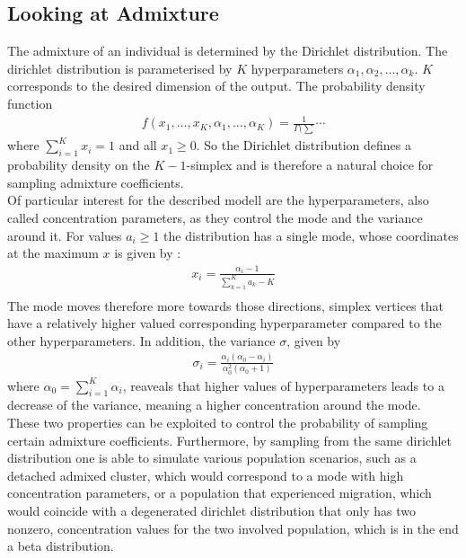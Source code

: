 \documentclass[a4paper, 11pt]{article}
\begin{document}
\subsection{Looking at Admixture}
The admixture of an individual is determined by the Dirichlet distribution. The dirichlet distribution is parameterised by $K$ hyperparameters $\alpha_1,\alpha_2, \ldots, \alpha_k$. $K$ corresponds to the desired dimension of the output. The probability density function
\begin{align*}
f(x_1, \ldots, x_K, \alpha_1, \ldots, \alpha_K) = \frac{1}{\Gamma(\sum} \cdots
\end{align*}
where $\sum^{K}_{i =1} x_i = 1$ and all $x_1 \geq 0$. So the Dirichlet distribution defines a probability density on the $K-1$-simplex and is therefore a natural choice for sampling admixture coefficients. \\
Of particular interest for the described modell are the hyperparameters, also called concentration parameters, as they control the mode and the variance around it. For values $a_i \geq 1$ the distribution has a single mode, whose coordinates at the maximum $x$ is given by \cite{bishop2006pattern}: 
\begin{align*}
x_i = \frac{\alpha_i - 1}{\sum^K_{k=1} a_k -K} \\
\end{align*}
The mode moves therefore more towards those directions, simplex vertices that have a relatively higher valued corresponding hyperparameter compared to the other hyperparameters. In addition, the variance $\sigma$, given by 
\begin{align*}
\sigma_i = \frac{\alpha_i(\alpha_0 - \alpha_i)}{\alpha_0^2(\alpha_0 + 1)}
\end{align*} 
where $\alpha_0 = \sum^{K}_{i = 1} \alpha_i$, reaveals that higher values of hyperparameters leads to a decrease of the variance, meaning a higher concentration around the mode. \\
These two properties can be exploited to control the probability of sampling certain admixture coefficients. Furthermore, by sampling from the same dirichlet distribution one is able to simulate various population scenarios, such as a detached admixed cluster, which would correspond to a mode with high concentration parameters, or a population that experienced migration, which would coincide with a degenerated dirichlet distribution that only has two nonzero, concentration values for the two involved population, which is in the end a beta distribution.
\end{document}

